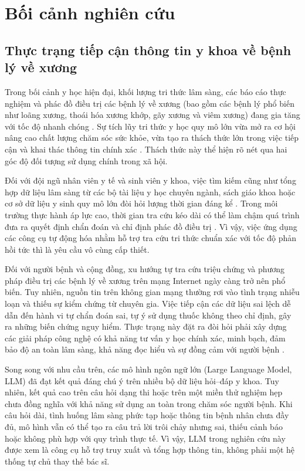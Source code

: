 \section{Bối cảnh nghiên cứu}

\subsection{Thực trạng tiếp cận thông tin y khoa về bệnh lý về xương}
Trong bối cảnh y học hiện đại, khối lượng tri thức lâm sàng, các báo cáo thực nghiệm và phác đồ điều trị các bệnh lý về xương (bao gồm các bệnh lý phổ biến như loãng xương, thoái hóa xương khớp, gãy xương và viêm xương) đang gia tăng với tốc độ nhanh chóng \cite{who2022musculoskeletal}. Sự tích lũy tri thức y học quy mô lớn vừa mở ra cơ hội nâng cao chất lượng chăm sóc sức khỏe, vừa tạo ra thách thức lớn trong việc tiếp cận và khai thác thông tin chính xác \cite{medrag2024}. Thách thức này thể hiện rõ nét qua hai góc độ đối tượng sử dụng chính trong xã hội.


Đối với đội ngũ nhân viên y tế và sinh viên y khoa, việc tìm kiếm cũng như tổng hợp dữ liệu lâm sàng từ các bộ tài liệu y học chuyên ngành, sách giáo khoa hoặc cơ sở dữ liệu y sinh quy mô lớn đòi hỏi lượng thời gian đáng kể \cite{ortho_rag_13}. Trong môi trường thực hành áp lực cao, thời gian tra cứu kéo dài có thể làm chậm quá trình đưa ra quyết định chẩn đoán và chỉ định phác đồ điều trị \cite{medrag2024}. Vì vậy, việc ứng dụng các công cụ tự động hóa nhằm hỗ trợ tra cứu tri thức chuẩn xác với tốc độ phản hồi tức thì là yêu cầu vô cùng cấp thiết.

Đối với người bệnh và cộng đồng, xu hướng tự tra cứu triệu chứng và phương pháp điều trị các bệnh lý về xương trên mạng Internet ngày càng trở nên phổ biến. Tuy nhiên, nguồn tin trên không gian mạng thường rơi vào tình trạng nhiễu loạn và thiếu sự kiểm chứng từ chuyên gia. Việc tiếp cận các dữ liệu sai lệch dễ dẫn đến hành vi tự chẩn đoán sai, tự ý sử dụng thuốc không theo chỉ định, gây ra những biến chứng nguy hiểm. Thực trạng này đặt ra đòi hỏi phải xây dựng các giải pháp công nghệ có khả năng tư vấn y học chính xác, minh bạch, đảm bảo độ an toàn lâm sàng, khả năng đọc hiểu và sự đồng cảm với người bệnh \cite{ortho_rag_13}.

Song song với nhu cầu trên, các mô hình ngôn ngữ lớn (Large Language Model, LLM) đã đạt kết quả đáng chú ý trên nhiều bộ dữ liệu hỏi--đáp y khoa. Tuy nhiên, kết quả cao trên câu hỏi dạng thi hoặc trên một miền thử nghiệm hẹp chưa đồng nghĩa với khả năng sử dụng an toàn trong chăm sóc người bệnh. Khi câu hỏi dài, tình huống lâm sàng phức tạp hoặc thông tin bệnh nhân chưa đầy đủ, mô hình vẫn có thể tạo ra câu trả lời trôi chảy nhưng sai, thiếu cảnh báo hoặc không phù hợp với quy trình thực tế. Vì vậy, LLM trong nghiên cứu này được xem là công cụ hỗ trợ truy xuất và tổng hợp thông tin, không phải một hệ thống tự chủ thay thế bác sĩ.


